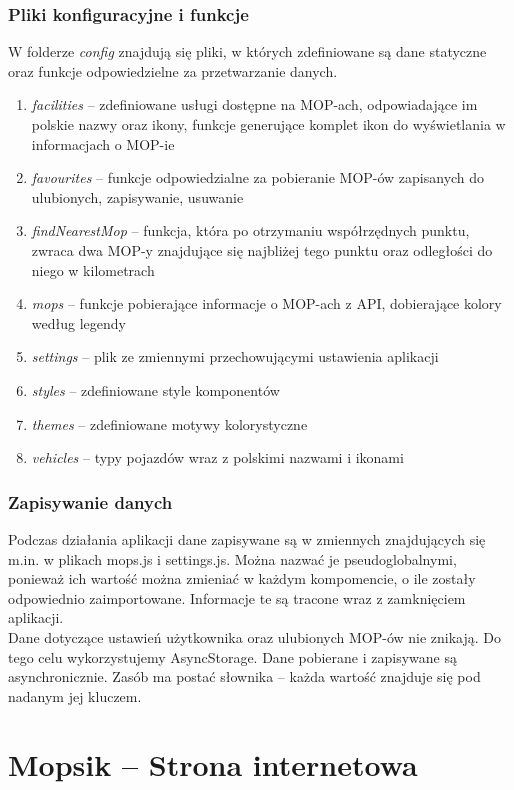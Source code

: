 \subsection{Pliki konfiguracyjne i funkcje}
W folderze \textit{config} znajdują się pliki, w których zdefiniowane są dane statyczne oraz funkcje odpowiedzielne za przetwarzanie danych.
\begin{enumerate}
\item \textit{facilities} -- zdefiniowane usługi dostępne na MOP-ach, odpowiadające im polskie nazwy oraz ikony, funkcje generujące komplet ikon do wyświetlania w informacjach o MOP-ie
\item \textit{favourites} -- funkcje odpowiedzialne za pobieranie MOP-ów zapisanych do ulubionych, zapisywanie, usuwanie
\item \textit{findNearestMop} -- funkcja, która po otrzymaniu współrzędnych punktu, zwraca dwa MOP-y znajdujące się najbliżej tego punktu oraz odległości do niego w kilometrach
\item \textit{mops} -- funkcje pobierające informacje o MOP-ach z API, dobierające kolory według legendy
\item \textit{settings} -- plik ze zmiennymi przechowującymi ustawienia aplikacji
\item \textit{styles} -- zdefiniowane style komponentów
\item \textit{themes} -- zdefiniowane motywy kolorystyczne
\item \textit{vehicles} -- typy pojazdów wraz z polskimi nazwami i ikonami
\end{enumerate}

\subsection{Zapisywanie danych}
Podczas działania aplikacji dane zapisywane są w zmiennych znajdujących się m.in. w plikach mops.js i settings.js. Można nazwać je pseudoglobalnymi, ponieważ ich wartość można zmieniać w każdym kompomencie, o ile zostały odpowiednio zaimportowane. Informacje te są tracone wraz z zamknięciem aplikacji.\\
Dane dotyczące ustawień użytkownika oraz ulubionych MOP-ów nie znikają. Do tego celu wykorzystujemy AsyncStorage. Dane pobierane i zapisywane są asynchronicznie. Zasób ma postać słownika -- każda wartość znajduje się pod nadanym jej kluczem.


\chapter{Mopsik -- Strona internetowa}

